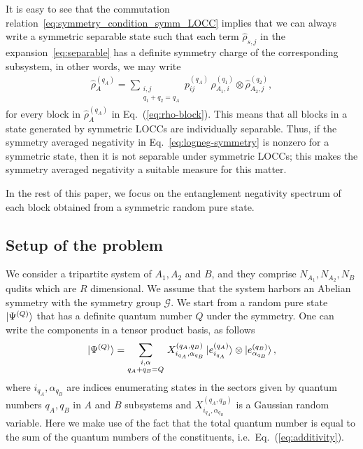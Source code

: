 \documentclass[aps,pra,reprint,superscriptaddress,twocolumn,notitlepage]{revtex4-1}
\numberwithin{equation}{section}
\begin{document}
It is easy to see that the commutation relation~\eqref{eq:symmetry_condition_symm_LOCC} implies that we can always write a symmetric separable state such that each term $\hat \rho_{s,j}$ in the expansion~\eqref{eq:separable}
has a definite symmetry charge of the corresponding subsystem, in other words, we may write
\begin{align}
   \hat \rho_{A}^{(q_A)} = \sum_{\substack{i,j \\ q_1+q_2=q_A}} p^{(q_A)}_{ij}\,\hat\rho^{(q_1)}_{A_1,i}\otimes \hat\rho^{(q_2)}_{A_2,j},
\end{align}
for every block in $\hat \rho_{A}^{(q_A)}$ in Eq.~(\ref{eq:rho-block}).
This means that all blocks  in a state generated by symmetric LOCCs are individually separable. Thus, if the symmetry averaged negativity in Eq.~\eqref{eq:logneg-symmetry} is nonzero for a symmetric state, then it is not separable under symmetric LOCCs; this makes the symmetry averaged negativity a suitable measure for this matter.




In the rest of this paper, we focus on the entanglement negativity spectrum of each block obtained from a symmetric random pure state.




\subsection{Setup of the problem}
We consider a tripartite system of $A_1, A_2$ and $B$, and they comprise $N_{A_1},N_{A_2},N_{B}$ qudits which are $R$ dimensional. We assume that the system harbors an Abelian symmetry with the symmetry group $\mathcal{G}$. We start from a random pure state $\ket{\Psi^{(Q)}}$ that has a definite quantum number $Q$ under the symmetry. One can write the components in a tensor product basis, as follows
\begin{align}
\label{eq:componenets_psi_Gamma}
\ket{\Psi^{(Q)}  } = \sum_{\substack{i,\alpha \\
                  q_A + q_B = Q}} \, X_{i_{q_A}, \alpha_{q_B}}^{(q_A, q_B)} \ket{e_{i_{q_A}}^{(q_A)}}\otimes \ket{e_{\alpha_{q_B}}^{(q_B)}},
\end{align}
where $i_{q_A}, \alpha_{q_B}$ are indices enumerating states in the sectors given by quantum numbers $q_A, q_B$ in $A$ and $B$ subsystems and  $X_{i_{q_A}, \alpha_{q_B}}^{(q_A, q_B)}$ is a Gaussian random variable. Here we make use of the fact that the total quantum number is equal to the sum of the quantum numbers of the constituents, i.e.~Eq.~(\ref{eq:additivity}).
\end{document}

